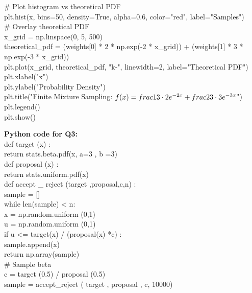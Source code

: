 \documentclass[final,11pt]{article}
\begin{document}
\begin{spacing}{1.25}
{    # Plot histogram vs theoretical PDF \\
    plt.hist(x, bins=50, density=True, alpha=0.6, color="red", label="Samples") \\

    # Overlay theoretical PDF \\
    x_grid = np.linspace(0, 5, 500) \\
    theoretical_pdf = (weights[0] * 2 * np.exp(-2 * x_grid)) + (weights[1] * 3 * np.exp(-3 * x_grid)) \\
    plt.plot(x_grid, theoretical_pdf, "k-", linewidth=2, label="Theoretical PDF") \\

    plt.xlabel("x") \\
    plt.ylabel("Probability Density") \\
    plt.title("Finite Mixture Sampling: $f(x) = \\frac{1}{3} \cdot 2e^{-2x} + \\frac{2}{3} \cdot 3e^{-3x}$") \\
    plt.legend() \\
    plt.show() \\
}

{\color{blue}
\textbf{Python code for Q3:} \\
def target (x) : \\
return stats.beta.pdf(x, a=3 , b =3) \\
def proposal (x) : \\
return stats.uniform.pdf(x) \\
def accept _ reject (target ,proposal,c,n) : \\
sample = [] \\
while len(sample) < n: \\
x = np.random.uniform (0,1) \\
u = np.random.uniform (0,1) \\
if u <= target(x) / (proposal(x) *c) : \\
sample.append(x) \\
return np.array(sample) \\
# Sample beta \\
c = target (0.5) / proposal (0.5) \\
sample = accept_reject ( target , proposal , c, 10000) \\
}

\end{spacing}
\end{document}
